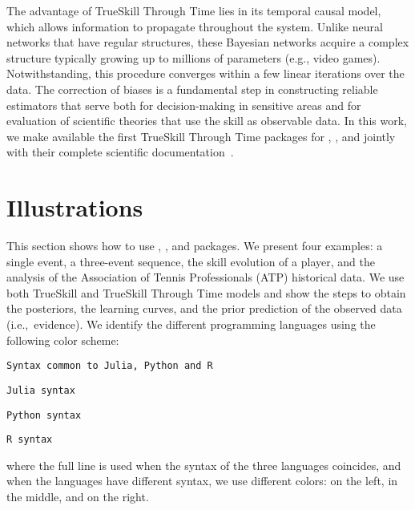 \documentclass[article]{jss}
\begin{document}

The advantage of TrueSkill Through Time lies in its temporal causal model, which allows information to propagate throughout the system. 
Unlike neural networks that have regular structures, these Bayesian networks acquire a complex structure typically growing up to millions of parameters (e.g., video games). 
Notwithstanding, this procedure converges within a few linear iterations over the data. 
The correction of biases is a fundamental step in constructing reliable estimators that serve both for decision-making in sensitive areas and for evaluation of scientific theories that use the skill as observable data. 
In this work, we make available the first TrueSkill Through Time packages for , , and  jointly with their complete scientific documentation~\citep{Landfried-repo:ttt}. 

\section{Illustrations} \label{sec:illustrations}

This section shows how to use , , and  packages. 
We present four examples: a single event, a three-event sequence, the skill evolution of a player, and the analysis of the Association of Tennis Professionals (ATP) historical data. 
We use both TrueSkill and TrueSkill Through Time models and show the steps to obtain the posteriors, the learning curves, and the prior prediction of the observed data (i.e.,~evidence). 
We identify the different programming languages using the following color scheme:
%
\begin{lstlisting}[captionpos=b, backgroundcolor=\color{all}, belowskip=-0.77 \baselineskip,escapechar=|]
Syntax common to Julia, Python and R
\end{lstlisting}
\begin{paracol}{3}
\begin{lstlisting}[backgroundcolor=\color{julia!60}]
Julia syntax
\end{lstlisting}
  \switchcolumn
\begin{lstlisting}[backgroundcolor=\color{python!60}]
Python syntax
\end{lstlisting}
   \switchcolumn
\begin{lstlisting}[backgroundcolor=\color{r!50}]
R syntax
\end{lstlisting}  
\end{paracol}
%
where the full line is used when the syntax of the three languages coincides, and when the languages have different syntax, we use different colors:  on the left,  in the middle, and  on the right. 
\end{document}
